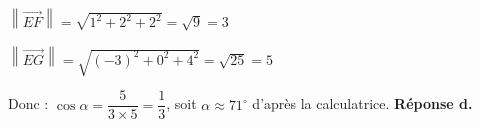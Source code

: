 \documentclass[10pt]{article}
\providecommand{\vect}[1]{\overrightarrow{#1}}
\providecommand{\degre}{{^\circ}}
\begin{document}
\begin{enumerate}
	$\left\|\vect{EF}\right\| = \sqrt{1^2 + 2^2 + 2^2} = \sqrt{9} = 3$
	
	$\left\|\vect{EG}\right\| = \sqrt{(-3)^2 + 0^2 + 4^2} = \sqrt{25} = 5$
	
	Donc :
	$\cos \alpha = \dfrac{5}{3 \times 5} = \dfrac{1}{3}$, soit $\alpha \approx 71\degre$ d'après la calculatrice.
	\textbf{Réponse d.}
\end{enumerate}

\bigskip
\end{document}
